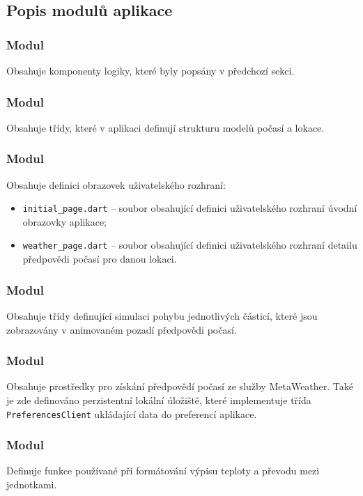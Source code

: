 \documentclass[12pt, a4paper]{article}
\begin{document}
\subsection{Popis modulů aplikace}

\subsubsection{Modul }
Obsahuje komponenty logiky, které byly popsány v předchozí sekci.

\subsubsection{Modul }
Obsahuje třídy, které v aplikaci definují strukturu modelů počasí a lokace.

\subsubsection{Modul }
Obsahuje definici obrazovek uživatelského rozhraní:

\begin{itemize}
	\item \texttt{initial\_page.dart} -- soubor obsahující definici uživatelského rozhraní úvodní obrazovky aplikace;
	\item \texttt{weather\_page.dart} -- soubor obsahující definici uživatelského rozhraní detailu předpovědi počasí pro danou lokaci.
\end{itemize}

\subsubsection{Modul }
Obsahuje třídy definující simulaci pohybu jednotlivých částicí, které jsou zobrazovány v animovaném pozadí předpovědi počasí.

\subsubsection{Modul }
Obsahuje prostředky pro získání předpovědí počasí ze služby MetaWeather. Také je zde definováno perzistentní lokální úložiště, které implementuje třída \texttt{PreferencesClient} ukládající data do preferencí aplikace.

\subsubsection{Modul }
Definuje funkce používané při formátování výpisu teploty a převodu mezi jednotkami.
\end{document}
